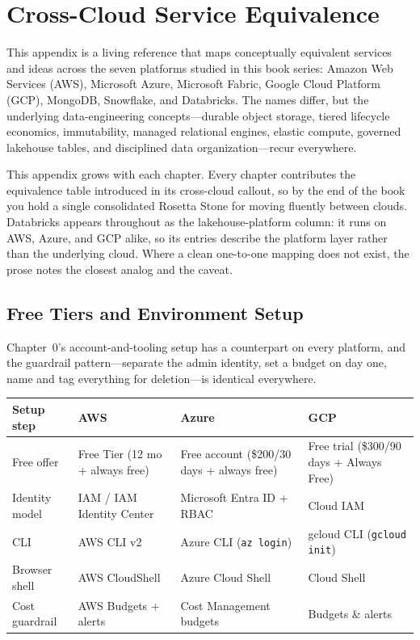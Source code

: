 \chapter{Cross-Cloud Service Equivalence}
%
This appendix is a living reference that maps conceptually equivalent services and
ideas across the seven platforms studied in this book series: Amazon Web Services
(AWS), Microsoft Azure, Microsoft Fabric, Google Cloud Platform (GCP), MongoDB,
Snowflake, and Databricks. The names differ, but the underlying data-engineering
concepts---durable object storage, tiered lifecycle economics, immutability, managed
relational engines, elastic compute, governed lakehouse tables, and disciplined data
organization---recur everywhere.

\begin{notebox}
This appendix grows with each chapter. Every chapter contributes the equivalence
table introduced in its cross-cloud callout, so by the end of the book you hold a
single consolidated Rosetta Stone for moving fluently between clouds. Databricks
appears throughout as the lakehouse-platform column: it runs on AWS, Azure, and GCP
alike, so its entries describe the platform layer rather than the underlying cloud.
Where a clean one-to-one mapping does not exist, the prose notes the closest analog
and the caveat.
\end{notebox}

\section{Free Tiers and Environment Setup}
%
Chapter~0's account-and-tooling setup has a counterpart on every platform, and the
guardrail pattern---separate the admin identity, set a budget on day one, name and
tag everything for deletion---is identical everywhere.

\begin{center}
\footnotesize
\begin{tabular}{@{}p{2.9cm}p{3.0cm}p{3.0cm}p{3.0cm}@{}}
\toprule
\textbf{Setup step} & \textbf{AWS} & \textbf{Azure} & \textbf{GCP} \\
\midrule
Free offer & Free Tier (12 mo + always free) & Free account (\$200/30 days + always free) & Free trial (\$300/90 days + Always Free) \\
Identity model & IAM / IAM Identity Center & Microsoft Entra ID + RBAC & Cloud IAM \\
CLI & AWS CLI v2 & Azure CLI (\texttt{az login}) & gcloud CLI (\texttt{gcloud init}) \\
Browser shell & AWS CloudShell & Azure Cloud Shell & Cloud Shell \\
Cost guardrail & AWS Budgets + alerts & Cost Management budgets & Budgets \& alerts \\
\bottomrule
\end{tabular}
\end{center}

